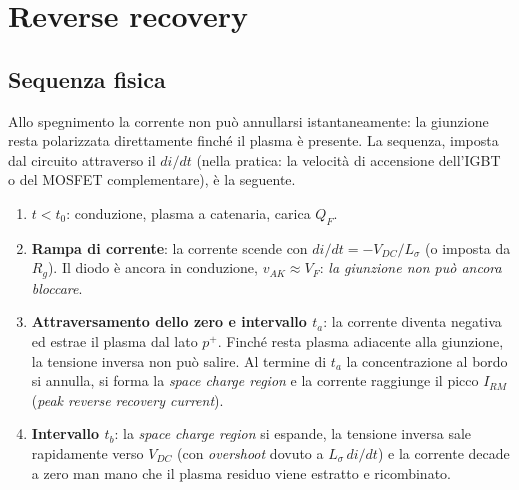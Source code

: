 \documentclass[11pt,a4paper]{article}
\begin{document}
\section{Reverse recovery}
\label{sec:rr}

\subsection{Sequenza fisica}

Allo spegnimento la corrente non può annullarsi istantaneamente: la giunzione
resta polarizzata direttamente finché il plasma è presente. La sequenza,
imposta dal circuito attraverso il $di/dt$ (nella pratica: la velocità di
accensione dell'IGBT o del MOSFET complementare), è la seguente.

\begin{enumerate}
\item \textbf{$t < t_0$}: conduzione, plasma a catenaria, carica $Q_F$.
\item \textbf{Rampa di corrente}: la corrente scende con
$di/dt = -V_{DC}/L_{\sigma}$ (o imposta da $R_g$). Il diodo è ancora
in conduzione, $v_{AK} \approx V_F$: \emph{la giunzione non può ancora bloccare}.
\item \textbf{Attraversamento dello zero e intervallo $t_a$}: la corrente
diventa negativa ed estrae il plasma dal lato $p^{+}$. Finché resta plasma
adiacente alla giunzione, la tensione inversa non può salire. Al termine di
$t_a$ la concentrazione al bordo si annulla, si forma la \emph{space charge
region} e la corrente raggiunge il picco $I_{RM}$ (\emph{peak reverse recovery
current}).
\item \textbf{Intervallo $t_b$}: la \emph{space charge region} si espande, la
tensione inversa sale rapidamente verso $V_{DC}$ (con \emph{overshoot} dovuto a
$L_\sigma\,di/dt$) e la corrente decade a zero man mano che il plasma residuo
viene estratto e ricombinato.
\end{enumerate}
\end{document}
